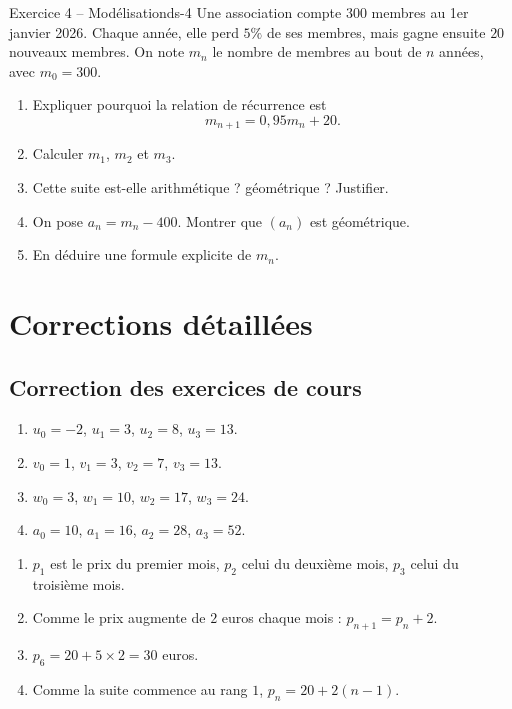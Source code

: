 \documentclass[11pt,a4paper]{article}
\begin{document}
\begin{exercisebox}{Exercice 4 -- Modélisation}{ds-4}
Une association compte $300$ membres au 1er janvier 2026. Chaque année, elle perd $5\%$ de ses membres, mais gagne ensuite $20$ nouveaux membres.
On note $m_n$ le nombre de membres au bout de $n$ années, avec $m_0=300$.
\begin{enumerate}
  \item Expliquer pourquoi la relation de récurrence est
  \[
  m_{n+1}=0{,}95m_n+20.
  \]
  \item Calculer $m_1$, $m_2$ et $m_3$.
  \item Cette suite est-elle arithmétique ? géométrique ? Justifier.
  \item On pose $a_n=m_n-400$. Montrer que $(a_n)$ est géométrique.
  \item En déduire une formule explicite de $m_n$.
\end{enumerate}
\end{exercisebox}

\newpage
\section{Corrections détaillées}

\subsection*{Correction des exercices de cours}

\begin{correctionbox}
\begin{enumerate}[label=\alph*)]
  \item $u_0=-2$, $u_1=3$, $u_2=8$, $u_3=13$.
  \item $v_0=1$, $v_1=3$, $v_2=7$, $v_3=13$.
  \item $w_0=3$, $w_1=10$, $w_2=17$, $w_3=24$.
  \item $a_0=10$, $a_1=16$, $a_2=28$, $a_3=52$.
\end{enumerate}
\end{correctionbox}

\begin{correctionbox}
\begin{enumerate}
  \item $p_1$ est le prix du premier mois, $p_2$ celui du deuxième mois, $p_3$ celui du troisième mois.
  \item Comme le prix augmente de $2$ euros chaque mois : $p_{n+1}=p_n+2$.
  \item $p_6=20+5\times2=30$ euros.
  \item Comme la suite commence au rang $1$, $p_n=20+2(n-1)$.
\end{enumerate}
\end{correctionbox}
\end{document}
